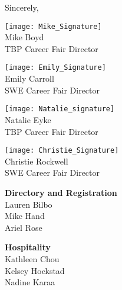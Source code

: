 \documentclass[twoside]{article}
\begin{document}
    Sincerely, \begin{multicols}{2}
    \begin{minipage}{\columnwidth}
            \texttt{[image: Mike\_Signature]}\\
            Mike Boyd\\
            TBP Career Fair Director\\
            \end{minipage}
\begin{minipage}{\columnwidth}
            \texttt{[image: Emily\_Signature]}\\
            Emily Carroll\\
            SWE Career Fair Director\\
            \end{minipage}
\begin{minipage}{\columnwidth}
            \texttt{[image: Natalie\_signature]}\\
            Natalie Eyke\\
            TBP Career Fair Director\\
            \end{minipage}
\begin{minipage}{\columnwidth}
            \texttt{[image: Christie\_Signature]}\\
            Christie Rockwell\\
            SWE Career Fair Director\\
            \end{minipage}
\end{multicols}\begin{multicols}{2}
    \begin{minipage}{\columnwidth}
    {\bf Directory and Registration}\\
    Lauren Bilbo\\
    Mike Hand\\
    Ariel Rose\\
    
\end{minipage}
    \begin{minipage}{\columnwidth}
    {\bf Hospitality}\\
    Kathleen Chou\\
    Kelsey Hockstad\\
    Nadine Karaa\\
    

\end{minipage}
\end{multicols}
\end{document}
